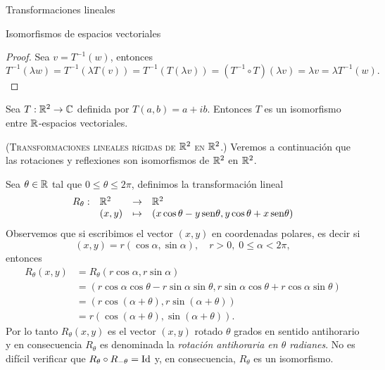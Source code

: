 \begin{chapter}{Transformaciones lineales}
\begin{section}{Isomorfismos de espacios vectoriales}
\begin{proof}
            Sea $v = T^{-1}(w)$, entonces
            \begin{equation*}
            T^{-1}(\lambda w) = 	T^{-1}(\lambda T(v))  = 	T^{-1}(T(\lambda v)) = (T^{-1}\circ T)(\lambda v) = \lambda v = \lambda  T^{-1}(w). 
            \end{equation*}
        \end{proof}

        \begin{ejemplo*}
            Sea $T: \mathbb R^2 \to \mathbb C$ definida por $T(a,b) = a+ ib$. Entonces $T$ es un isomorfismo entre $\mathbb R$-espacios vectoriales. 
        \end{ejemplo*}

        \begin{ejemplo}\label{ejemplo-transformaciones-rigidas-del-plano}(\textsc{Transformaciones lineales rígidas de $\mathbb R^2$ en $\mathbb R^2$.}) Veremos a continuación que las rotaciones y reflexiones son isomorfismos de  $\mathbb R^2$  en  $\mathbb R^2$.  
            
        Sea $\theta \in \mathbb R$ tal que  $0 \le \theta \le 2\pi$,  definimos la transformación lineal
            \begin{equation*}
                \begin{array}{llll}
                R_\theta:&\mathbb R^2 &\to &\mathbb R^2 \\
                &(x,y) &\mapsto & (x \cos\theta - y {\,\operatorname{sen}}\theta, y\cos\theta+ x{\,\operatorname{sen}}\theta)
                \end{array}
            \end{equation*}
            Observemos que si escribimos el vector $(x,y)$  en coordenadas polares,  es decir  si 
            $$
            (x,y)= r(\cos\alpha,\sin\alpha),\quad r> 0, \; 0 \le \alpha < 2\pi, 
            $$
            entonces
            \begin{align*}
                R_\theta(x,y) &= R_\theta(r\cos\alpha,r\sin\alpha) \\
                &= (r\cos\alpha \cos\theta - r\sin\alpha \sin\theta, r\sin\alpha\cos\theta+ r\cos\alpha\sin\theta) \\
                &= (r\cos(\alpha+\theta) , r\sin(\alpha+\theta)) \\
                &= r(\cos(\alpha+\theta) , \sin(\alpha+\theta)).
            \end{align*}
            Por lo tanto $R_\theta(x,y)$ es el vector $(x,y)$ rotado $\theta$ grados en sentido antihorario y en consecuencia  $R_\theta$ es denominada la \textit{rotación antihoraria en $\theta$ radianes}. No es difícil verificar que  $R_\theta \circ R_{-\theta} = \operatorname{Id}$ y, en consecuencia,  $R_\theta$  es un isomorfismo.  


\end{ejemplo}
\end{section}
\end{chapter}
